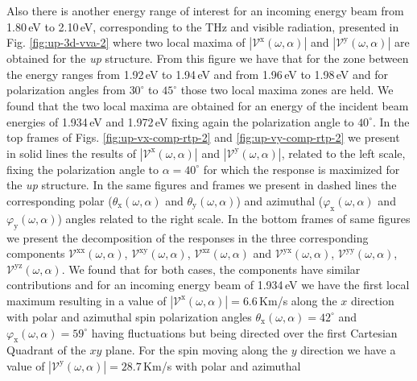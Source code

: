 \documentclass[prb,11pt,tightenlines,twocolumn,aps]{revtex4-1}
\begin{document}
Also there is another energy range of interest for an incoming energy beam from
1.80\,eV to 2.10\,eV, corresponding to the THz and visible radiation, presented
in Fig. \ref{fig:up-3d-vva-2} where two local maxima of
$|\mathcal{V}^{\mathrm{x}}(\omega,\alpha)|$ and
$|\mathcal{V}^{\mathrm{y}}(\omega,\alpha)|$ are obtained for the \emph{up}
structure.
% 
From this figure we have that for the zone between the energy ranges from
1.92\,eV to 1.94\,eV and from 1.96\,eV to 1.98\,eV and for polarization angles
from $30^{\circ}$ to $45^{\circ}$ those two local maxima zones are held.
% 
We found that the two local maxima are obtained for an energy of the incident
beam energies of 1.934\,eV and 1.972\,eV fixing again the polarization angle to
$40^{\circ}$. 
In the top frames of Figs. \ref{fig:up-vx-comp-rtp-2} and 
% 
\ref{fig:up-vy-comp-rtp-2} we present in solid lines the results of
$|\mathcal{V}^{\mathrm{x}}(\omega,\alpha)|$ and
$|\mathcal{V}^{\mathrm{y}}(\omega,\alpha)|$, related to the left scale, fixing
the polarization angle to $\alpha=40^{\circ}$ for which the response is
maximized for the \emph{up} structure. In the same figures and frames we present
in dashed lines the corresponding polar ($\theta_{\mathrm{x}}(\omega,\alpha)$
and $\theta_{\mathrm{y}}(\omega,\alpha)$) and azimuthal
($\varphi_{\mathrm{x}}(\omega,\alpha)$ and
$\varphi_{\mathrm{y}}(\omega,\alpha)$) angles related to the right scale. In the
bottom frames of same figures we present the decomposition of the responses in
the three corresponding components $\mathcal{V}^{\mathrm{xx}}(\omega,\alpha)$,
$\mathcal{V}^{\mathrm{xy}}(\omega,\alpha)$,
$\mathcal{V}^{\mathrm{xz}}(\omega,\alpha)$ and
$\mathcal{V}^{\mathrm{yx}}(\omega,\alpha)$,
$\mathcal{V}^{\mathrm{yy}}(\omega,\alpha)$,
$\mathcal{V}^{\mathrm{yz}}(\omega,\alpha)$.
% 
We found that for both cases, the components have similar contributions and for
an incoming energy beam of 1.934\,eV  we have the first local maximum resulting
in a value of $|\mathcal{V}^{\mathrm{x}}(\omega,\alpha)|= 6.6$\,Km/s along the
$x$ direction  with polar and azimuthal spin polarization angles
$\theta_{\mathrm{x}}(\omega,\alpha)= 42^{\circ}$ and
$\varphi_{\mathrm{x}}(\omega,\alpha)=59^{\circ}$ having fluctuations but being
directed over the first Cartesian Quadrant of the $xy$ plane.
% 
For the spin moving along the $y$ direction we have a value of
$|\mathcal{V}^{\mathrm{y}}(\omega,\alpha)|=28.7$\,Km/s with polar and azimuthal
\end{document}
